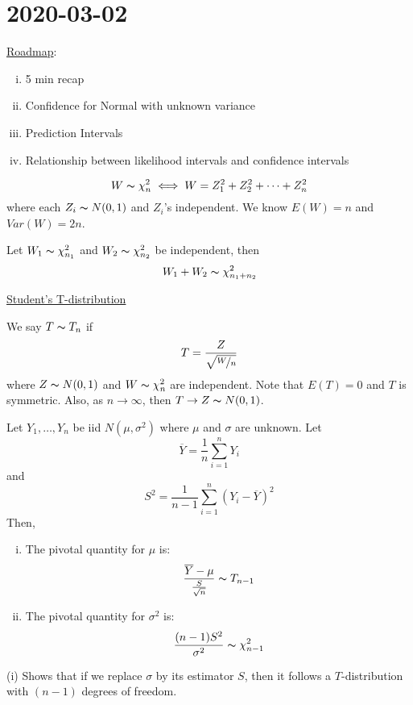 \section{2020-03-02}
\underline{Roadmap}:
\begin{enumerate}[(i)]
    \item 5 min recap
    \item Confidence for Normal with unknown variance
    \item Prediction Intervals
    \item Relationship between likelihood intervals and confidence intervals
\end{enumerate}
\[ W \thicksim \chi^2_n\iff W=Z_1^2+Z_2^2+\cdots+Z_n^2 \]
where each $ Z_i \thicksim N(0,1) $ and $ Z_i $'s independent. We know
$ E(W)=n $ and $ Var(W)=2n $.

Let $ W_1 \thicksim \chi^2_{n_1} $ and $ W_2 \thicksim \chi^2_{n_2} $
be independent, then
\[ W_1+W_2 \thicksim \chi^2_{n_1+n_2} \]

\underline{Student's T-distribution}

We say $ T \thicksim T_n $ if
\[ T=\frac{Z}{\sqrt{\nicefrac{W}{n}}}  \]
where $ Z \thicksim N(0,1) $ and $ W \thicksim \chi^2_n $ are independent. Note
that $ E(T)=0 $ and $ T $ is symmetric. Also, as $ n \to \infty $, then
$ T \to Z \thicksim N(0,1) $.

\begin{thmbox}
    \begin{theorem}
        Let $ Y_1,\ldots ,Y_n $ be iid $ N(\mu,\sigma^2) $ where $ \mu $ and $ \sigma $ are
        unknown. Let
        \[ \overline{Y}=\frac{1}{n} \sum\limits_{i=1}^{n} Y_i \]
        and
        \[ S^2=\frac{1}{n-1} \sum\limits_{i=1}^{n} (Y_i-\overline{Y})^2 \]
        Then,
        \begin{enumerate}[(i)]
            \item The pivotal quantity for $ \mu $ is:
                  \[ \frac{\overline{Y}-\mu}{\frac{S}{\sqrt{n}}} \thicksim T_{n-1}  \]
            \item The pivotal quantity for $ \sigma^2 $ is:
                  \[ \frac{(n-1)S^2}{\sigma^2} \thicksim \chi^2_{n-1}  \]
        \end{enumerate}
    \end{theorem}
\end{thmbox}
\begin{remark}
    (i) Shows that if we replace $ \sigma $ by its estimator $ S $, then it follows a $ T $-distribution
    with $ (n-1) $ degrees of freedom.
\end{remark}

